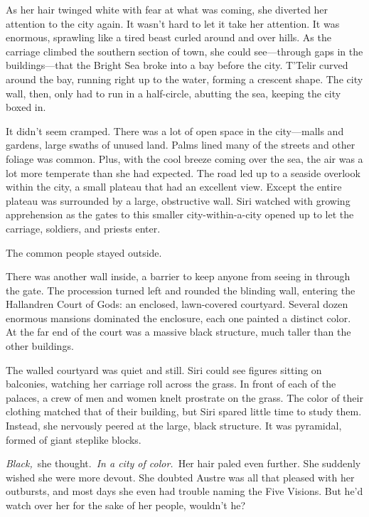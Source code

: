 As her hair twinged white with fear at what was coming, she diverted her attention to the city again. It wasn’t hard to let it take her attention. It was enormous, sprawling like a tired beast curled around and over hills. As the carriage climbed the southern section of town, she could see—through gaps in the buildings—that the Bright Sea broke into a bay before the city. T’Telir curved around the bay, running right up to the water, forming a crescent shape. The city wall, then, only had to run in a half-circle, abutting the sea, keeping the city boxed in.

It didn’t seem cramped. There was a lot of open space in the city—malls and gardens, large swaths of unused land. Palms lined many of the streets and other foliage was common. Plus, with the cool breeze coming over the sea, the air was a lot more temperate than she had expected. The road led up to a seaside overlook within the city, a small plateau that had an excellent view. Except the entire plateau was surrounded by a large, obstructive wall. Siri watched with growing apprehension as the gates to this smaller city-within-a-city opened up to let the carriage, soldiers, and priests enter.

The common people stayed outside.

There was another wall inside, a barrier to keep anyone from seeing in through the gate. The procession turned left and rounded the blinding wall, entering the Hallandren Court of Gods: an enclosed, lawn-covered courtyard. Several dozen enormous mansions dominated the enclosure, each one painted a distinct color. At the far end of the court was a massive black structure, much taller than the other buildings.

The walled courtyard was quiet and still. Siri could see figures sitting on balconies, watching her carriage roll across the grass. In front of each of the palaces, a crew of men and women knelt prostrate on the grass. The color of their clothing matched that of their building, but Siri spared little time to study them. Instead, she nervously peered at the large, black structure. It was pyramidal, formed of giant steplike blocks.

\textit{Black,}~she thought.~\textit{In a city of color.}~Her hair paled even further. She suddenly wished she were more devout. She doubted Austre was all that pleased with her outbursts, and most days she even had trouble naming the Five Visions. But he’d watch over her for the sake of her people, wouldn’t he?

